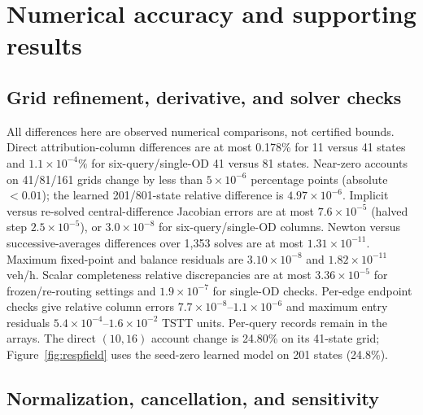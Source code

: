 \section{Numerical accuracy and supporting results}\label{supp:numdetail}\label{supp:transrecords}
\subsection{Grid refinement, derivative, and solver checks}\label{supp:accuracy}
All differences here are observed numerical comparisons, not certified
bounds. Direct attribution-column differences are at most 0.178\% for
11 versus 41 states and $1.1\times10^{-4}\%$ for six-query/single-OD
41 versus 81 states. Near-zero accounts on 41/81/161 grids change by
less than $5\times10^{-6}$ percentage points (absolute $<0.01$); the
learned 201/801-state relative difference is $4.97\times10^{-6}$.
Implicit versus re-solved central-difference Jacobian errors are at most
$7.6\times10^{-5}$ (halved step $2.5\times10^{-5}$), or
$3.0\times10^{-8}$ for six-query/single-OD columns. Newton versus
successive-averages differences over 1,353 solves are at most
$1.31\times10^{-11}$. Maximum fixed-point and balance residuals are
$3.10\times10^{-8}$ and $1.82\times10^{-11}$ veh/h. Scalar completeness
relative discrepancies are at most $3.36\times10^{-5}$ for
frozen/re-routing settings and $1.9\times10^{-7}$ for single-OD checks.
Per-edge endpoint checks give relative column errors
$7.7\times10^{-8}$--$1.1\times10^{-6}$ and maximum entry residuals
$5.4\times10^{-4}$--$1.6\times10^{-2}$ TSTT units. Per-query records
remain in the arrays. The direct $(10,16)$ account change is 24.80\%
on its 41-state grid; Figure~\ref{fig:respfield} uses the seed-zero
learned model on 201 states (24.8\%).

\subsection{Normalization, cancellation, and sensitivity}\label{supp:additional}
